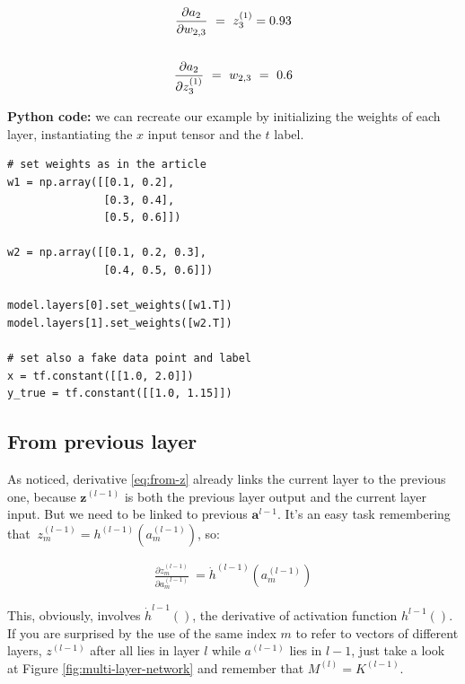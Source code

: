 \documentclass{article}
\begin{document}
\begin{gather}
\frac{\partial a_{2}}{\partial w_{2,3}} \ =\ z_{3}^{( 1)} =0.93 \notag  \\
\notag\\
\frac{\partial a_{2}}{\partial z_{3}^{( 1)}} \ =\ w_{2,3} \ =\ 0.6 \notag
\end{gather}

\begin{center}\textleaf\end{center}

\textbf{Python code:} we can recreate our example by initializing the weights of each layer, instantiating the $x$ input tensor and the $t$ label.

\begin{tcolorbox}[colback=gray!10, colframe=gray!50, title=Parameters initialization]
\begin{verbatim}
# set weights as in the article
w1 = np.array([[0.1, 0.2],
               [0.3, 0.4],
               [0.5, 0.6]])

w2 = np.array([[0.1, 0.2, 0.3],
               [0.4, 0.5, 0.6]])

model.layers[0].set_weights([w1.T])
model.layers[1].set_weights([w2.T])

# set also a fake data point and label
x = tf.constant([[1.0, 2.0]])
y_true = tf.constant([[1.0, 1.15]])
\end{verbatim}
\end{tcolorbox}


\subsection{From previous layer}\label{sec:from-previous}
As noticed, derivative \eqref{eq:from-z} already links the current layer to the previous one, because $\displaystyle \mathbf{z}^{( l-1)}$ is both the previous layer output and the current layer input. But we need to be linked to previous $\boldsymbol{a}^{l-1}$. It's an easy task remembering that $\displaystyle \ z_{m}^{( l-1)} =h^{( l-1)}( a_{m}^{( l-1)})$, so:


\begin{gather}
\frac{\partial z_{m}^{( l-1)}}{\partial a_{m}^{( l-1)}} \ =\dot{h}^{( l-1)} (a_{m}^{(l-1)})\label{eq:prev}
\end{gather}

This, obviously, involves $\dot{h}^{l-1}()$, the derivative of activation function $h^{l-1}()$. If you are surprised by the use of the same index $m$ to refer to vectors of different layers, $z^{(l-1)}$ after all lies in layer $l$ while $a^{(l-1)}$ lies in $l-1$, just take a look at Figure \ref{fig:multi-layer-network} and remember that $M^{(l)}=K^{(l-1)}$.   \\
\end{document}
